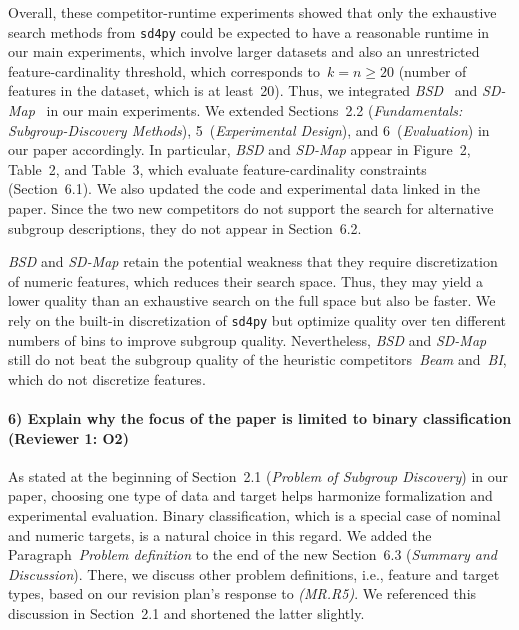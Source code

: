 \documentclass{article}
\begin{document}
Overall, these competitor-runtime experiments showed that only the exhaustive search methods from \texttt{sd4py} could be expected to have a reasonable runtime in our main experiments, which involve larger datasets and also an unrestricted feature-cardinality threshold, which corresponds to~$k = n \geq 20$ (number of features in the dataset, which is at least~20).
Thus, we integrated \emph{BSD}~\cite{lemmerich2010fast} and \emph{SD-Map}~\cite{atzmueller2006sd} in our main experiments.
We extended Sections~2.2 (\emph{Fundamentals: Subgroup-Discovery Methods}), 5~(\emph{Experimental Design}), and 6~(\emph{Evaluation}) in our paper accordingly.
In particular, \emph{BSD} and \emph{SD-Map} appear in Figure~2, Table~2, and Table~3, which evaluate feature-cardinality constraints (Section~6.1).
We also updated the code and experimental data linked in the paper.
Since the two new competitors do not support the search for alternative subgroup descriptions, they do not appear in Section~6.2.

\emph{BSD} and \emph{SD-Map} retain the potential weakness that they require discretization of numeric features, which reduces their search space.
Thus, they may yield a lower quality than an exhaustive search on the full space but also be faster.
We rely on the built-in discretization of \texttt{sd4py} but optimize quality over ten different numbers of bins to improve subgroup quality.
Nevertheless, \emph{BSD} and \emph{SD-Map} still do not beat the subgroup quality of the heuristic competitors~\emph{Beam} and~\emph{BI}, which do not discretize features.

\paragraph{6) Explain why the focus of the paper is limited to binary classification (Reviewer 1: O2)}

As stated at the beginning of Section~2.1 (\emph{Problem of Subgroup Discovery}) in our paper, choosing one type of data and target helps harmonize formalization and experimental evaluation.
Binary classification, which is a special case of nominal and numeric targets, is a natural choice in this regard.
We added the Paragraph~\emph{Problem definition} to the end of the new Section~6.3 (\emph{Summary and Discussion}).
There, we discuss other problem definitions, i.e., feature and target types, based on our revision plan's response to \emph{(MR.R5)}.
We referenced this discussion in Section~2.1 and shortened the latter slightly.
\end{document}

